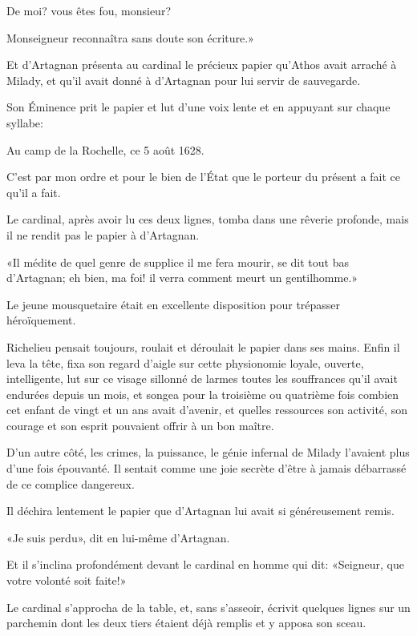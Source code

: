 \speak  De moi? vous êtes fou, monsieur? 

\speak  Monseigneur reconnaîtra sans doute son écriture.» 

Et d'Artagnan présenta au cardinal le précieux papier qu'Athos avait arraché à Milady, et qu'il avait donné à d'Artagnan pour lui servir de sauvegarde. 

Son Éminence prit le papier et lut d'une voix lente et en appuyant sur chaque syllabe: 

\begin{mail}{Au camp de la Rochelle, ce 5 août 1628.}
	
C'est par mon ordre et pour le bien de l'État que le porteur du présent a fait ce qu'il a fait.
\end{mail}

Le cardinal, après avoir lu ces deux lignes, tomba dans une rêverie profonde, mais il ne rendit pas le papier à d'Artagnan. 

«Il médite de quel genre de supplice il me fera mourir, se dit tout bas d'Artagnan; eh bien, ma foi! il verra comment meurt un gentilhomme.» 

Le jeune mousquetaire était en excellente disposition pour trépasser héroïquement. 

Richelieu pensait toujours, roulait et déroulait le papier dans ses mains. Enfin il leva la tête, fixa son regard d'aigle sur cette physionomie loyale, ouverte, intelligente, lut sur ce visage sillonné de larmes toutes les souffrances qu'il avait endurées depuis un mois, et songea pour la troisième ou quatrième fois combien cet enfant de vingt et un ans avait d'avenir, et quelles ressources son activité, son courage et son esprit pouvaient offrir à un bon maître. 

D'un autre côté, les crimes, la puissance, le génie infernal de Milady l'avaient plus d'une fois épouvanté. Il sentait comme une joie secrète d'être à jamais débarrassé de ce complice dangereux. 

Il déchira lentement le papier que d'Artagnan lui avait si généreusement remis. 

«Je suis perdu», dit en lui-même d'Artagnan. 

Et il s'inclina profondément devant le cardinal en homme qui dit: «Seigneur, que votre volonté soit faite!» 

Le cardinal s'approcha de la table, et, sans s'asseoir, écrivit quelques lignes sur un parchemin dont les deux tiers étaient déjà remplis et y apposa son sceau. 


